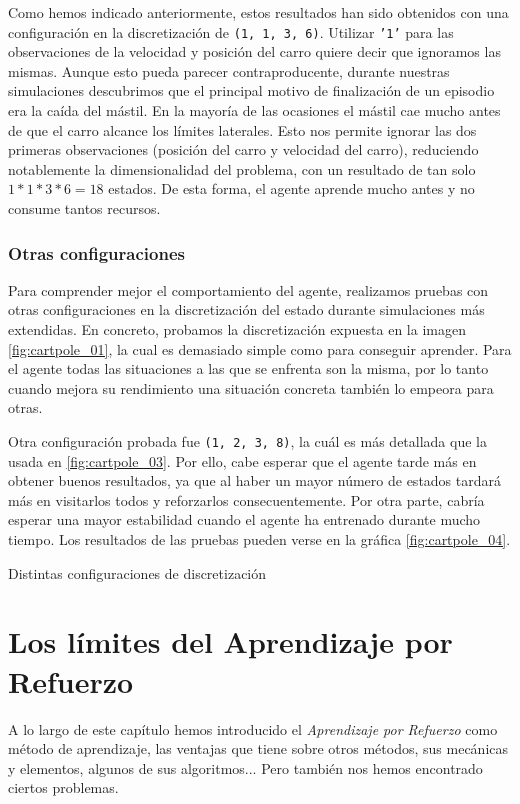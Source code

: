 Como hemos indicado anteriormente, estos resultados han sido obtenidos con una configuración en la discretización de \texttt{(1, 1, 3, 6)}. Utilizar \texttt{'1'} para las observaciones de la velocidad y posición del carro quiere decir que ignoramos las mismas. Aunque esto pueda parecer contraproducente, durante nuestras simulaciones descubrimos que el principal motivo de finalización de un episodio era la caída del mástil. En la mayoría de las ocasiones el mástil cae mucho antes de que el carro alcance los límites laterales. Esto nos permite ignorar las dos primeras observaciones (posición del carro y velocidad del carro), reduciendo notablemente la dimensionalidad del problema, con un resultado de tan solo $1*1*3*6=18$ estados. De esta forma, el agente aprende mucho antes y no consume tantos recursos.


\subsubsection{Otras configuraciones}

Para comprender mejor el comportamiento del agente, realizamos pruebas con otras configuraciones en la discretización del estado durante simulaciones más extendidas. En concreto, probamos la discretización expuesta en la imagen \ref{fig:cartpole_01}, la cual es demasiado simple como para conseguir aprender. Para el agente todas las situaciones a las que se enfrenta son la misma, por lo tanto cuando mejora su rendimiento una situación concreta también lo empeora para otras.

Otra configuración probada fue \texttt{(1, 2, 3, 8)}, la cuál es más detallada que la usada en \ref{fig:cartpole_03}. Por ello, cabe esperar que el agente tarde más en obtener buenos resultados, ya que al haber un mayor número de estados tardará más en visitarlos todos y reforzarlos consecuentemente. Por otra parte, cabría esperar una mayor estabilidad cuando el agente ha entrenado durante mucho tiempo. Los resultados de las pruebas pueden verse en la gráfica \ref{fig:cartpole_04}.

%
       {Distintas configuraciones de discretización}


\section{Los límites del Aprendizaje por Refuerzo}

A lo largo de este capítulo hemos introducido el \textit{Aprendizaje por Refuerzo} como método de aprendizaje, las ventajas que tiene sobre otros métodos, sus mecánicas y elementos, algunos de sus algoritmos... Pero también nos hemos encontrado ciertos problemas.

